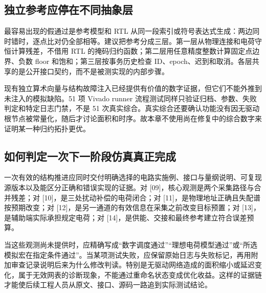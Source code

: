 \subsection{独立参考应停在不同抽象层}
最容易出现的假通过是参考模型和 RTL 从同一段索引或符号表达式生成：两边同时错时，逐点比对仍全部相等。建议把参考分成三层。第一层从物理连接和电荷守恒计算残差，不借用 RTL 的掩码归约函数；第二层用任意精度整数计算固定点边界、负数 floor 和饱和；第三层按事务历史检查 ID、epoch、迟到和取消。各层共享的是公开接口契约，而不是被测实现的内部步骤。

现有独立算术向量与结构故障注入已经提供有价值的数字证据，但它们不能外推到未注入的模拟缺陷。51 项 Vivado runner 流程测试同样只验证归档、参数、失败判定和特定日志门禁，不是 51 次真实综合。真实综合还要确认功能没有因无驱动根节点被常量化，随后才讨论面积和时序。故本章不使用尚在修复中的综合数字来证明某一种归约拓扑更优。

\subsection{如何判定一次下一阶段仿真真正完成}
一次有效的结构推进应同时交付明确选择的电路实施例、接口与量纲说明、可复现源版本以及能区分正确和错误实现的证据。对 [09]，核心观测是两个采集路径与合并残差；对 [10]，是三处扰动补偿的电荷闭合；对 [11]，是物理地址正确且失配谱按预期改变；对 [12]，是另一通道的有效信息在采集之前改变目标预置；对 [13]，是辅助端实际承担规定电荷；对 [14]，是供能、交接和最终参考建立符合误差预算。

当这些观测尚未提供时，应精确写成“数字调度通过”“理想电荷模型通过”或“所选模拟宏在指定条件通过”。当某项测试失败，应保留原始日志与失败标记，再用附加审查记录说明后来为什么修改判读。特别是无驱动网络造成的面积缩小或延迟变化，属于无效网表的诊断现象，不能通过重命名状态变成优化收益。这样的证据链才能使后续工程人员从原文、接口、源码一路追到实际测试结论。
